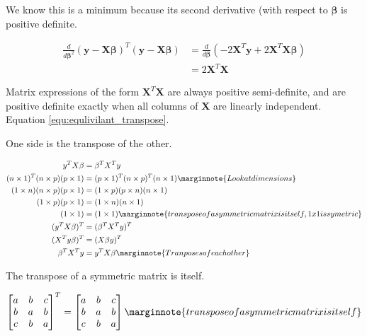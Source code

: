 \documentclass[10pt,letterpaper,twoside]{article}
\begin{document}
We know this is a minimum because its second derivative (with respect to $\bm{\beta}$ is positive definite.

\begin{align}
    \frac{d}{d\bm{\beta}^2}(\bm{y} - \bm{X}\bm{\beta})^T (\bm{y} - \bm{X}\bm{\beta}) &= \frac{d}{d\bm{\beta}} (- 2\bm{X}^T\bm{y} + 2\bm{X}^T\bm{X}\bm{\beta})\\
     &= 2\bm{X}^T\bm{X}
\end{align}

Matrix expressions of the form $\bm{X}^T\bm{X}$ are always positive semi-definite, and are positive definite exactly when all columns of $\bm{X}$ are linearly independent.
Equation \ref{equ:equlivilant_transpose}.

One side is the transpose of the other.

\begin{align}
   y^TX\beta     &= \beta^TX^Ty\\
   (n \times 1)^T (n \times p) (p \times 1) &= (p \times 1)^T (n \times p)^T (n \times 1)
        \nonumber \marginnote{Look at dimensions}\\
   (1 \times n) (n \times p) (p \times 1) &= (1 \times p) (p \times n) (n \times 1)
        \nonumber\\
   (1 \times p) (p \times 1) &= (1 \times n) (n \times 1) \nonumber\\
   (1 \times 1) &= (1 \times 1)
        \nonumber \marginnote{transpose of a symmetric matrix is itself, 1x1 is symetric}\\
   (y^TX\beta)^T &= (\beta^TX^Ty)^T\\
   (X^Ty\beta)^T &= (X\beta y)^T\\
   \beta^TX^Ty   &= y^TX\beta \marginnote{Tranposes of each other}
\end{align}

The transpose of a symmetric matrix is itself.

\begin{align}
\begin{bmatrix}
a & b & c \\
b & a & b \\
c & b & a
\end{bmatrix}^{T}
=
\begin{bmatrix}
a & b & c \\
b & a & b \\
c & b & a
\end{bmatrix}
\marginnote{transpose of a symmetric matrix is itself}
\end{align}
\end{document}
